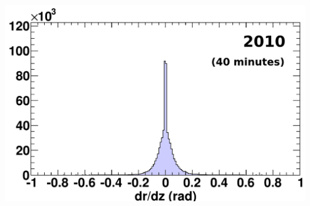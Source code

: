 \documentclass[compress]{beamer}
\begin{document}
\begin{frame}
\begin{columns}
\includegraphics[width=\linewidth]{beamhalo2010_drdz.pdf}
\end{columns}
\end{frame}
\end{document}

